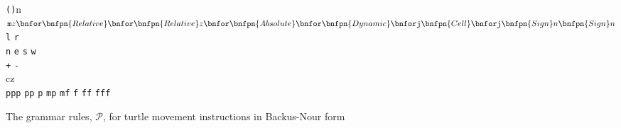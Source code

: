 %
%
%
%
%
%
%
%

\newenvironment{bnfsplit}[1][0.7\textwidth]
 {\minipage[t]{#1}$}
 {$\endminipage}

\begin{figure}[ht]
\renewcommand{\models}{::=}
\begin{bnf*}
  {
   }\\
    {
    \bnfor {}
     }\\
   {
   \texttt{(}\texttt{)}n
   \bnfor {}
    }\\
    {
    \begin{bnfsplit}
    \texttt{m}z
    \bnfor \bnfpn{Relative}
    \bnfor \bnfpn{Relative}z
    \bnfor \bnfpn{Absolute}
    \bnfor \bnfpn{Dynamic}
    \\ \bnfor \texttt{j}\bnfpn{Cell}
    \bnfor \texttt{j}\bnfpn{Sign}n\bnfpn{Sign}n
    \end{bnfsplit}
     }\\
     {
     \texttt{l}
     \bnfor \texttt{r}
      }\\
    {
    \texttt{n}
    \bnfor \texttt{e}
    \bnfor \texttt{s}
    \bnfor \texttt{w}
     }\\
   {
   \texttt{+}
   \bnfor \texttt{-}
    }\\
    {
    cz
     }\\
   {
   \texttt{ppp}
   \bnfor \texttt{pp}
   \bnfor \texttt{p}
   \bnfor \texttt{mp}
   \bnfor \texttt{mf}
   \bnfor \texttt{f}
   \bnfor \texttt{ff}
   \bnfor \texttt{fff}
    }\\
\end{bnf*}
\vspace{-35pt}
\caption{The grammar rules, $\mathcal{P}$, for turtle movement instructions in Backus-Nour form}
\label{fig:grammar}
\end{figure}


